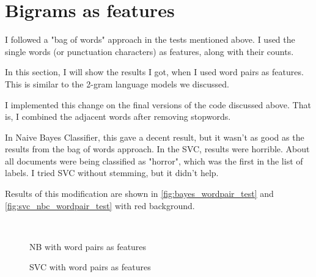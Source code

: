 \section{Bigrams as features}

I followed a "bag of words" approach in the tests mentioned above. I used the single words (or punctuation characters) as features, along with their counts.

In this section, I will show the results I got, when I used word pairs as features. This is similar to the 2-gram language models we discussed.

I implemented this change on the final versions of the code discussed above. That is, I combined the adjacent words after removing stopwords.

In Naive Bayes Classifier, this gave a decent result, but it wasn't as good as the results from the bag of words approach. In the SVC, results were horrible. About all documents were being classified as "horror", which was the first in the list of labels. I tried SVC without stemming, but it didn't help.

Results of this modification are shown in \autoref{fig:bayes_wordpair_test} and \autoref{fig:svc_nbc_wordpair_test} with red background.

\

\begin{figure}[htpb]
    \caption{NB with word pairs as features}
    \label{fig:bayes_wordpair_test}
    \begin{tcolorbox}[colback=red!30!white,
            title=NB - Word pairs]
        
    \end{tcolorbox}
\end{figure}

\begin{figure}[htpb]
    \caption{SVC with word pairs as features}
    \label{fig:svc_nbc_wordpair_test}
    \begin{tcolorbox}[colback=red!30!white,
            title=SVC - Word pairs]
        
    \end{tcolorbox}
\end{figure}